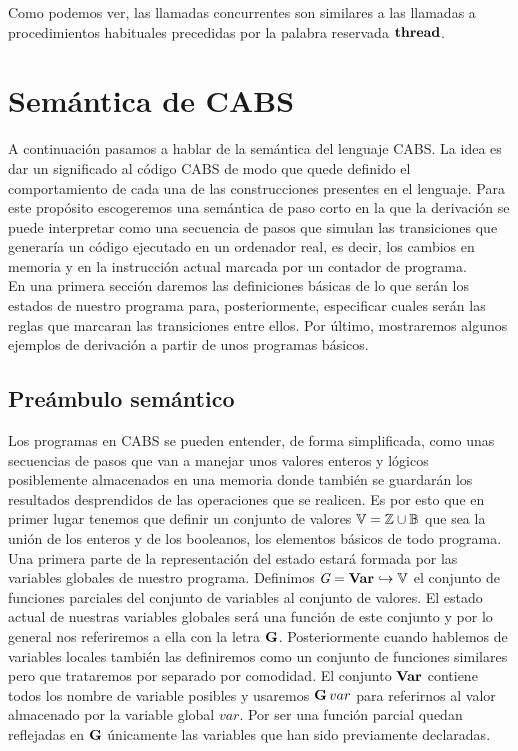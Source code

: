 
Como podemos ver, las llamadas concurrentes son similares a las llamadas a procedimientos habituales precedidas por la palabra reservada $\textbf{thread}$.

\section{Semántica de CABS}
A continuación pasamos a hablar de la semántica del lenguaje CABS. La idea es dar un significado al código CABS de modo que quede definido el comportamiento de cada una de las construcciones presentes en el lenguaje. Para este propósito escogeremos una semántica de paso corto en la que la derivación se puede interpretar como una secuencia de pasos que simulan las transiciones que generaría un código ejecutado en un ordenador real, es decir, los cambios en memoria y en la instrucción actual marcada por un contador de programa.\\

En una primera sección daremos las definiciones básicas de lo que serán los estados de nuestro programa para, posteriormente, especificar cuales serán las reglas que marcaran las transiciones entre ellos. Por último, mostraremos algunos ejemplos de derivación a partir de unos programas básicos.

\subsection{Preámbulo semántico}
Los programas en CABS se pueden entender, de forma simplificada, como unas secuencias de pasos que van a manejar unos valores enteros y lógicos posiblemente almacenados en una memoria donde también se guardarán los resultados desprendidos de las operaciones que se realicen. Es por esto que en primer lugar tenemos que definir un conjunto de valores $\mathbb{V} = \mathbb{Z} \cup \mathbb{B}$ que sea la unión de los enteros y de los booleanos, los elementos básicos de todo programa.\\

Una primera parte de la representación del estado estará formada por las variables globales de nuestro programa. Definimos $\textit{G} = \textbf{Var} \hookrightarrow \mathbb{V}$ el conjunto de funciones parciales del conjunto de variables al conjunto de valores. El estado actual de nuestras variables globales será una función de este conjunto y por lo general nos referiremos a ella con la letra $\mathbf{G}$. Posteriormente cuando hablemos de variables locales también las definiremos como un conjunto de funciones similares pero que trataremos por separado por comodidad. El conjunto $\textbf{Var}$ contiene todos los nombre de variable posibles y usaremos $\mathbf{G}\,var$ para referirnos al valor almacenado por la variable global $var$. Por ser una función parcial quedan reflejadas en $\mathbf{G}$ únicamente las variables que han sido previamente declaradas.\\

